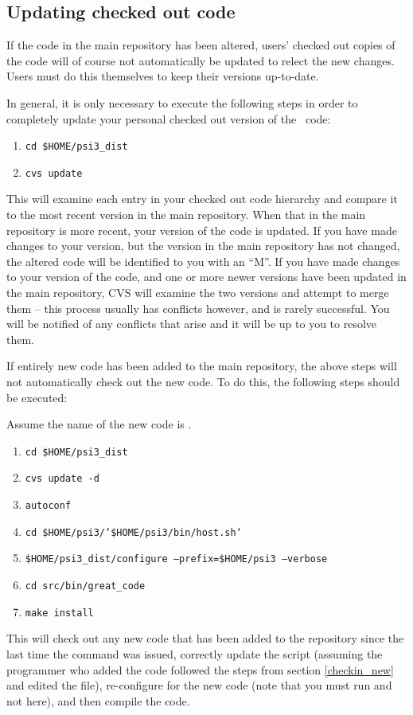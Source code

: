 \subsection{Updating checked out code}
If the code in the main repository has been altered, users' checked out copies of
the code will of course not automatically be updated to relect the new changes.
Users must do this themselves to keep their versions up-to-date.

In general, it is only necessary to execute the following steps in order to
completely update your personal checked out version of the \PSIthree\ code:
\begin{enumerate}
\item {\tt cd \$HOME/psi3\_dist}
\item {\tt cvs update}
\end{enumerate}
This will examine each entry in your checked out code hierarchy and compare it
to the most recent version in the main repository. When that in the main
repository is more recent, your version of the code is updated. If you have made
changes to your version, but the version in the main repository has not changed,
the altered code will be identified to you with an ``M''. If you have made
changes to your version of the code, and one or more newer versions have been
updated in the main repository, CVS will examine the two versions and attempt
to merge them -- this process usually has conflicts however, and is rarely
successful. You will be notified of any conflicts that arise and it will be up to
you to resolve them.

If entirely new code has been added to the main repository, the above steps will
not automatically check out the new code. To do this, the following steps should
be executed:

Assume the name of the new code is . 
\begin{enumerate}
\item {\tt cd \$HOME/psi3\_dist}
\item {\tt cvs update -d}
\item {\tt autoconf}
\item {\tt cd \$HOME/psi3/`\$HOME/psi3/bin/host.sh`} 
\item {\tt \$HOME/psi3\_dist/configure --prefix=\$HOME/psi3 --verbose}
\item {\tt cd src/bin/great\_code}
\item {\tt make install}
\end{enumerate}
This will check out any new code that has been added to the repository since the last time the
 command was issued, correctly update the  script
(assuming the programmer who added the code followed the steps from section \ref{checkin_new}
and edited the  file), re-configure for the new code (note that
you must run  and not  here), and then compile the
code.

